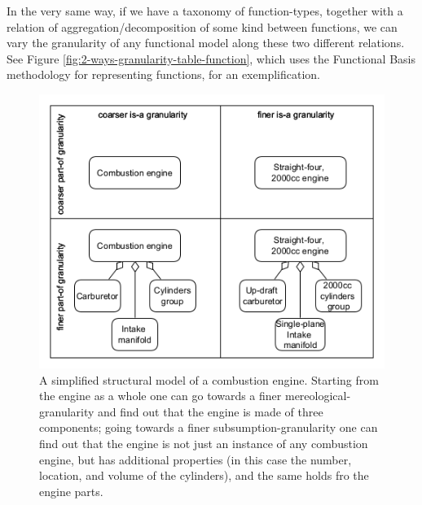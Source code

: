 \documentclass[
]{ceurart}
\begin{document}
In the very same way, if we have a taxonomy of function-types, together with a relation of aggregation/decomposition of some kind between functions, we can vary the granularity of any functional model along these two different relations. See Figure \ref{fig:2-ways-granularity-table-function}, which uses the Functional Basis methodology for representing functions, for an exemplification.

\begin{figure}
    \centering
    \includegraphics[width=\textwidth]{2-ways-granularity-table-new-new.PNG}
    \caption{\label{fig:2-ways-granularity-table-new-new}A simplified structural model of a combustion engine. Starting from the engine as a whole one can go towards a finer mereological-granularity and find out that the engine is made of three components; going towards a finer subsumption-granularity one can find out that the engine is not just an instance of any combustion engine, but has additional properties (in this case the number, location, and volume of the cylinders), and the same holds fro the engine parts.}
\end{figure}
\end{document}
